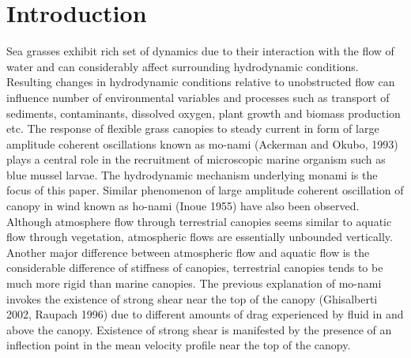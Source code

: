 \documentclass[aps,preprint,floatfix,prl]{revtex4-1}
\begin{document}
\section{Introduction}
Sea grasses exhibit rich set of dynamics due to their interaction with the flow of water and can considerably affect surrounding hydrodynamic conditions.
Resulting changes in hydrodynamic conditions relative to unobstructed flow can influence number of environmental variables and processes such as 
transport of sediments, contaminants, dissolved oxygen, plant growth and biomass production etc. 
The response of flexible grass canopies to steady current in form of large amplitude coherent oscillations known as mo-nami (Ackerman and Okubo, 1993) plays a central role
in the recruitment of microscopic marine organism such as blue mussel larvae. The hydrodynamic mechanism underlying monami is the focus of this paper. 
Similar phenomenon of large amplitude coherent oscillation of canopy in wind known as ho-nami (Inoue 1955) have also been observed.
\newline
Although atmosphere flow through terrestrial canopies seems similar to aquatic flow through vegetation, atmospheric flows are essentially unbounded vertically. Another major
difference between atmospheric flow and aquatic flow is the considerable difference of stiffness of canopies, terrestrial canopies tends to be much more rigid than marine canopies.
\newline   
The previous explanation of mo-nami invokes the existence of strong shear near the top of the canopy (Ghisalberti 2002, Raupach 1996) due to
different amounts of drag experienced by fluid in and above the canopy. Existence of strong shear is manifested by
the presence of an inflection point in the mean velocity profile near the top of the canopy.
\end{document}
